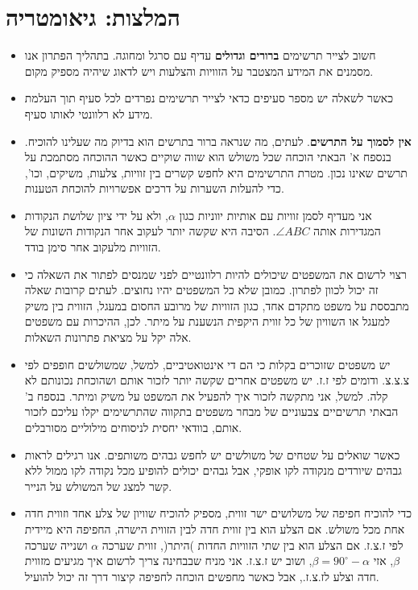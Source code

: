 

\np

\section*{המלצות: גיאומטריה}


\begin{itemize}
\item
חשוב לצייר תרשימים 
\textbf{ברורים וגדולים}
עדיף עם סרגל ומחוגה. בתהליך הפתרון אנו מסמנים את המידע המצטבר על הזוויות והצלעות ויש לדאוג שיהיה מספיק מקום.
\item
כאשר לשאלה יש מספר סעיפים כדאי לצייר תרשימים נפרדים לכל סעיף תוך העלמת מידע לא רלוונטי לאותו סעיף.

\item
\textbf{אין לסמוך על התרשים}.
לעתים, מה שנראה ברור בתרשים הוא בדיוק מה שעלינו להוכיח. בנספח א' הבאתי הוכחה שכל משולש הוא שווה שוקיים כאשר ההוכחה מסתמכת על תרשים שאינו נכון. מטרת התרשימים היא לחפש קשרים בין זוויות, צלעות, משיקים, וכו', כדי להעלות השערות על דרכים אפשרויות להוכחת הטענות.

\item
אני מעדיף לסמן זוויות עם אותיות יווניות כגון
$\alpha$,
ולא על ידי ציון שלושת הנקודות המגדירות אותה
$\angle ABC$.
הסיבה היא שקשה יותר לעקוב אחר הנקודות השונות של הזוויות מלעקוב אחר סימן בודד.

\item
רצוי לרשום את המשפטים שיכולים להיות רלוונטיים לפני שמנסים לפתור את השאלה כי זה יכול לכוון לפתרון. כמובן שלא כל המשפטים יהיו נחוצים. לעתים קרובות שאלה מתבססת על משפט מתקדם אחד, כגון הזוויות של מרובע החסום במעגל, הזווית בין משיק למעגל או השוויון של כל זווית היקפית הנשענת על מיתר. לכן, ההיכרות עם משפטים אלה יקל על מציאת פתרונות השאלות.

\item
יש משפטים שזוכרים בקלות כי הם די אינטואטיביים, למשל, שמשולשים חופפים לפי צ.צ.צ. ודומים לפי ז.ז. יש משפטים אחרים שקשה יותר לזכור אותם ושהוכחת נכונותם לא קלה. למשל, אני מתקשה לזכור איך להפעיל את המשפט על משיק ומיתר. בנספח ב' הבאתי תרשיםיים צבעוניים של מבחר משפטים בתקווה שהתרשימים יקלו עליכם לזכור אותם, בוודאי יחסית לניסוחים מילוליים מסורבלים.

\item
כאשר שואלים על שטחים של משולשים יש לחפש גבהים משותפים. אנו רגילים לראות גבהים שיורדים מנקודה לקו אופקי, אבל גבהים יכולים להופיע מכל נקודה לקו ממול ללא קשר למצג של המשולש על הנייר.

\item
כדי להוכיח חפיפה של משלושים ישר זווית, מספיק להוכיח שוויון של צלע אחד וזווית חדה אחת מכל משולש. אם הצלע הוא בין זווית חדה לבין הזווית הישרה, החפיפה היא מיידית לפי ז.צ.ז. אם הצלע הוא בין שתי הזוויות החדות )היתר(, זווית שערכה 
$\alpha$
ושנייה שערכה
$\beta$,
אזי
$\beta=90^\circ-\alpha$,
ושוב יש ז.צ.ז. אני מניח שבבחינה צריך לרשום איך מגיעים מזווית חדה וצלע לז.צ.ז., אבל כאשר מחפשים הוכחה לחפיפה קיצור דרך זה יכול להועיל.

\end{itemize}

